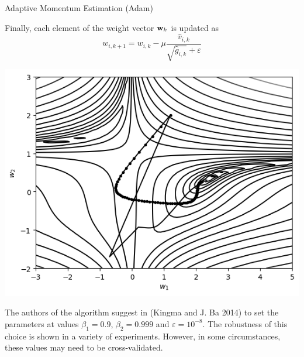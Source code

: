 \documentclass{beamer}
\begin{document}
\begin{frame}{Adaptive Momentum Estimation (Adam)}

Finally, each element of the weight vector ${\bf w}_k$ is updated as 
\begin{equation}\nonumber
    w_{i,k+1} = w_{i,k} -\mu \frac{\hat{v}_{i,k}}{\sqrt{\hat{g}_{i,k}}+\varepsilon} 
\end{equation}

\vspace{1cm}

\begin{multicols}{2}

\includegraphics[scale=0.4]{Module 1 (NN)/pics/Adam.png}

\columnbreak

The authors of the algorithm suggest in (Kingma and J. Ba 2014)  to set  the parameters at values $\beta_1=0.9$,  $\beta_2=0.999$ and $\varepsilon = 10^{-8}$. The robustness of this choice is shown in a variety of experiments. However, in some circumstances, these values may need to be cross-validated.   

\end{multicols}
    
\end{frame}
\end{document}
